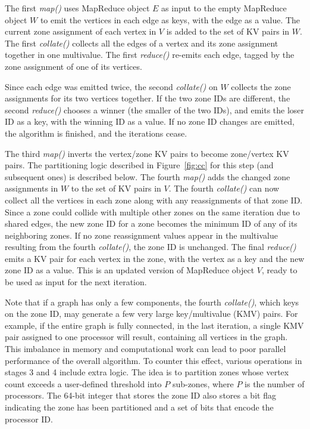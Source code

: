The first {\it map()} uses MapReduce object $E$ as input to the empty
MapReduce object $W$ to emit the vertices in each edge as keys, with
the edge as a value.  The current zone assignment of each vertex in
$V$ is added to the set of KV pairs in $W$.  The first {\it collate()}
collects all the edges of a vertex and its zone assignment together in
one multivalue.  The first {\it reduce()} re-emits each edge, tagged
by the zone assignment of one of its vertices.

Since each edge was emitted twice, the second {\it collate()} on $W$
collects the zone assignments for its two vertices together.  If the
two zone IDs are different, the second {\it reduce()} chooses a winner
(the smaller of the two IDs), and emits the loser ID as a key, with
the winning ID as a value.  If no zone ID changes are emitted, the
algorithm is finished, and the iterations cease.

The third {\it map()} inverts the vertex/zone KV pairs to become
zone/vertex KV pairs.  The partitioning logic described in
Figure~\ref{fig:cc} for this step (and subsequent ones) is described
below.  The fourth {\it map()} adds the changed zone assignments in
$W$ to the set of KV pairs in $V$.  The fourth {\it collate()} can now
collect all the vertices in each zone along with any reassignments of
that zone ID.  Since a zone could collide with multiple other zones on
the same iteration due to shared edges, the new zone ID for a zone
becomes the minimum ID of any of its neighboring zones.  If no zone
reassignment values appear in the multivalue resulting from the fourth
{\it collate()}, the zone ID is unchanged.  The final {\it reduce()}
emits a KV pair for each vertex in the zone, with the vertex as a key
and the new zone ID as a value.  This is an updated version of
MapReduce object $V$, ready to be used as input for the next
iteration.

Note that if a graph has only a few components, the fourth {\it
collate()}, which keys on the zone ID, may generate a few very large
key/multivalue (KMV) pairs.  For example, if the entire graph is fully
connected, in the last iteration, a single KMV pair assigned to one
processor will result, containing all vertices in the graph.  This
imbalance in memory and computational work can lead to poor parallel
performance of the overall algorithm.  To counter this effect, various
operations in stages 3 and 4 include extra logic.  The idea is to
partition zones whose vertex count exceeds a user-defined threshold
into $P$ sub-zones, where $P$ is the number of processors.  The 64-bit
integer that stores the zone ID also stores a bit flag indicating the
zone has been partitioned and a set of bits that encode the processor
ID.

